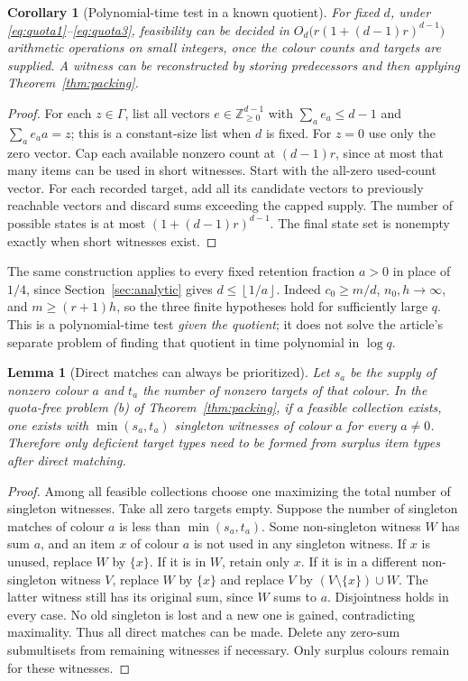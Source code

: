 \documentclass[11pt]{article}
\newtheorem{lemma}[theorem]{Lemma}
\newtheorem{corollary}[theorem]{Corollary}
\theoremstyle{remark}\newtheorem{remark}[theorem]{Remark}
\newcommand{\Z}{\mathbb Z}\newcommand{\C}{\mathbb C}\newcommand{\Pp}{\mathbb P}\newcommand{\E}{\mathbb E}\newcommand{\floor}[1]{\left\lfloor #1\right\rfloor}\newcommand{\supp}{\operatorname{supp}}\newcommand{\ord}{\operatorname{ord}}\newcommand{\G}{\Gamma}\newcommand{\DGRH}{\textnormal{\scshape DGRH}}
\begin{document}
\begin{corollary}[Polynomial-time test in a known quotient]\label{cor:dp}
For fixed $d$, under \eqref{eq:quota1}--\eqref{eq:quota3}, feasibility can be decided in $O_d\bigl(r(1+(d-1)r)^{d-1}\bigr)$ arithmetic operations on small integers, once the colour counts and targets are supplied. A witness can be reconstructed by storing predecessors and then applying Theorem~\ref{thm:packing}.
\end{corollary}
\begin{proof}
For each $z\in\G$, list all vectors $e\in\Z_{\ge0}^{d-1}$ with $\sum_a e_a\le d-1$ and $\sum_a e_a a=z$; this is a constant-size list when $d$ is fixed. For $z=0$ use only the zero vector. Cap each available nonzero count at $(d-1)r$, since at most that many items can be used in short witnesses. Start with the all-zero used-count vector. For each recorded target, add all its candidate vectors to previously reachable vectors and discard sums exceeding the capped supply. The number of possible states is at most $(1+(d-1)r)^{d-1}$. The final state set is nonempty exactly when short witnesses exist.
\end{proof}

The same construction applies to every fixed retention fraction $a>0$ in place of $1/4$, since Section~\ref{sec:analytic} gives $d\le\floor{1/a}$. Indeed $c_0\ge m/d$, $n_0,h\to\infty$, and $m\ge(r+1)h$, so the three finite hypotheses hold for sufficiently large $q$. This is a polynomial-time test \emph{given the quotient}; it does not solve the article's separate problem of finding that quotient in time polynomial in $\log q$.

\begin{lemma}[Direct matches can always be prioritized]\label{lem:direct}
Let $s_a$ be the supply of nonzero colour $a$ and $t_a$ the number of nonzero targets of that colour. In the quota-free problem (b) of Theorem~\ref{thm:packing}, if a feasible collection exists, one exists with $\min(s_a,t_a)$ singleton witnesses of colour $a$ for every $a\ne0$. Therefore only deficient target types need to be formed from surplus item types after direct matching.
\end{lemma}
\begin{proof}
Among all feasible collections choose one maximizing the total number of singleton witnesses. Take all zero targets empty. Suppose the number of singleton matches of colour $a$ is less than $\min(s_a,t_a)$. Some non-singleton witness $W$ has sum $a$, and an item $x$ of colour $a$ is not used in any singleton witness. If $x$ is unused, replace $W$ by $\{x\}$. If it is in $W$, retain only $x$. If it is in a different non-singleton witness $V$, replace $W$ by $\{x\}$ and replace $V$ by $(V\setminus\{x\})\cup W$. The latter witness still has its original sum, since $W$ sums to $a$. Disjointness holds in every case. No old singleton is lost and a new one is gained, contradicting maximality. Thus all direct matches can be made. Delete any zero-sum submultisets from remaining witnesses if necessary. Only surplus colours remain for these witnesses.
\end{proof}
\end{document}
